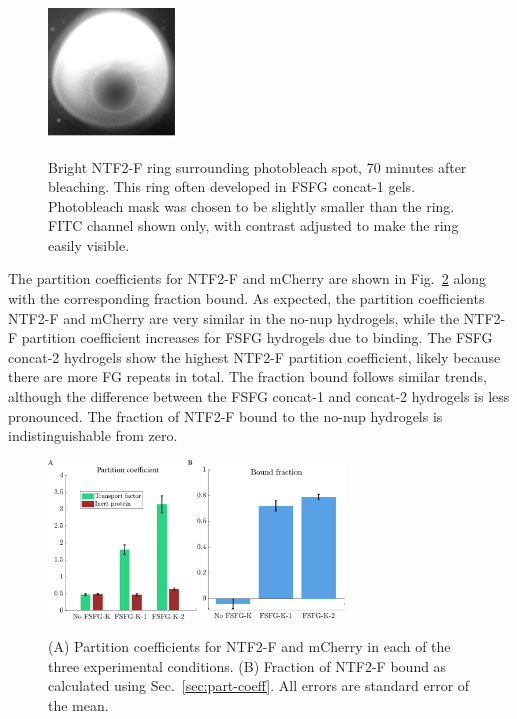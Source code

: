 \begin{figure}
\caption[Bright NTF2-F ring surrounding photobleach spot.]{Bright NTF2-F ring surrounding photobleach spot, 70 minutes after bleaching.  This ring often developed in FSFG concat-1 gels.  Photobleach mask was chosen to be slightly smaller than the ring.  FITC channel shown only, with contrast adjusted to make the ring easily visible.}
\centering
\includegraphics[width=0.3\textwidth]{figs/ch04/ring}
\label{fig:ring}
\end{figure} 

The partition coefficients for NTF2-F and mCherry are shown in Fig.~\ref{fig:frac-bound} along with the corresponding fraction bound.  As expected, the partition coefficients NTF2-F and mCherry are very similar in the no-nup hydrogels, while the NTF2-F partition coefficient increases for FSFG hydrogels due to binding.  The FSFG concat-2 hydrogels show the highest NTF2-F partition coefficient, likely because there are more FG repeats in total.  The fraction bound follows similar trends, although the difference between the FSFG concat-1 and concat-2 hydrogels is less pronounced.  The fraction of NTF2-F bound to the no-nup hydrogels is indistinguishable from zero.

\begin{figure}
\caption[Partition coefficients and fraction of NTF2 bound.]{(A) Partition coefficients for NTF2-F and mCherry in each of the three experimental conditions.  (B) Fraction of NTF2-F bound as calculated using Sec.~\ref{sec:part-coeff}.  All errors are standard error of the mean.\\}
\centering
\includegraphics[width=0.7\textwidth]{figs/ch04/fraction-bound}
\label{fig:frac-bound}
\end{figure} 


